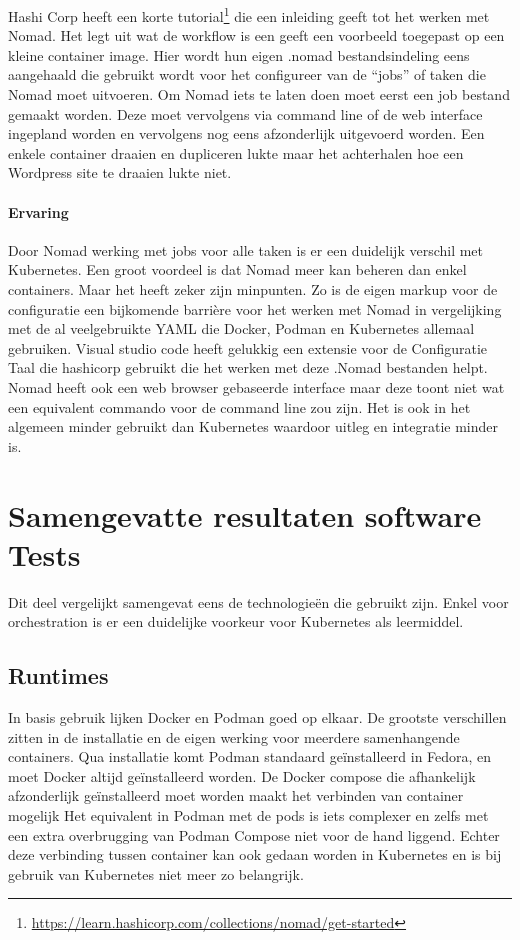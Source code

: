 Hashi Corp heeft een korte tutorial\footnote{\url{https://learn.hashicorp.com/collections/nomad/get-started}} die een inleiding geeft tot het werken met Nomad. Het legt uit wat de workflow is een geeft een voorbeeld toegepast op een kleine container image.  Hier wordt hun eigen .nomad bestandsindeling eens aangehaald die gebruikt wordt voor het configureer van de “jobs” of taken die Nomad moet uitvoeren. Om Nomad iets te laten doen moet eerst een job bestand gemaakt worden. Deze moet vervolgens via command line of de web interface ingepland worden en vervolgens nog eens afzonderlijk uitgevoerd worden. Een enkele container draaien en dupliceren lukte maar het achterhalen hoe een Wordpress site te draaien lukte niet.

\paragraph{Ervaring}
Door Nomad werking met jobs voor alle taken is er een duidelijk verschil met Kubernetes. Een groot voordeel is dat Nomad meer kan beheren dan enkel containers. Maar het heeft zeker zijn minpunten. Zo is de eigen markup voor de configuratie een bijkomende barrière voor het werken met Nomad in vergelijking met de al veelgebruikte YAML die Docker, Podman en Kubernetes allemaal gebruiken.  Visual studio code heeft gelukkig een extensie voor de Configuratie Taal die hashicorp gebruikt die het werken met deze .Nomad  bestanden helpt. Nomad heeft ook een web browser gebaseerde interface maar deze toont niet wat een equivalent commando voor de command line zou zijn. Het is ook in het algemeen minder gebruikt dan Kubernetes waardoor uitleg en integratie minder is.  

\section{Samengevatte resultaten software Tests}
Dit deel vergelijkt samengevat eens de technologieën die gebruikt zijn. Enkel voor orchestration is er een duidelijke voorkeur voor Kubernetes als leermiddel.

\subsection{Runtimes}

In basis gebruik lijken Docker en Podman goed op elkaar. De grootste verschillen zitten in de installatie en de eigen werking voor meerdere samenhangende containers. Qua installatie komt Podman standaard geïnstalleerd in Fedora, en moet Docker altijd geïnstalleerd worden. De Docker compose die afhankelijk afzonderlijk geïnstalleerd moet worden maakt het verbinden van container mogelijk  Het equivalent in Podman met de pods is iets complexer en zelfs met een extra overbrugging van Podman Compose niet voor de hand liggend. Echter deze verbinding tussen container kan ook gedaan worden in Kubernetes en is bij gebruik van Kubernetes niet meer zo belangrijk.

